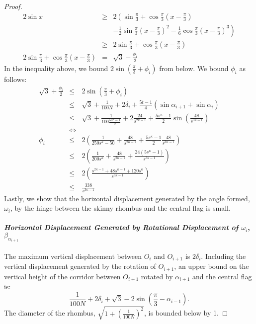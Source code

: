 \documentclass[10pt]{CSUNthesis}
\theoremstyle{plain}%
\theoremstyle{definition}
\theoremstyle{remark}
\newcommand{\lr}[1]{\left( #1 \right)}
\begin{document}
\begin{proof}
\begin{eqnarray*}
2 \sin x &\geq&  2 \left( \sin \frac{\pi}{3} + \cos \frac{\pi}{3} \lr{x - \frac{\pi}{3}}\right.\\
&& \left.- \frac{1}{2} \sin \frac{\pi}{3} \lr{x - \frac{\pi}{3}}^2 - \frac{1}{6} \cos \frac{\pi}{3} \lr{x - \frac{\pi}{3}}^3\right)\\
&\geq&2 \sin \frac{\pi}{3} + \cos \frac{\pi}{3} \lr{x - \frac{\pi}{3}}\\
2  \sin \frac{\pi}{3} + \cos \frac{\pi}{3} \lr{x - \frac{\pi}{3}} &=& \sqrt{3} + \frac{\phi_i}{2} 
\end{eqnarray*}
In the inequality above, we bound $2 \sin  \lr{\frac{\pi}{3} + \phi_i}$ from below. 
We bound $\phi_i$ as follows: 
\begin{eqnarray*}
\sqrt{3} + \frac{\phi_i}{2}  &\leq & 2\sin \lr{ \frac{\pi}{3} + \phi_i }\\
&\leq&\sqrt{3} + \frac{1}{100N} + 2 \delta_i + \frac{5t-1}{4}  \lr{ \sin \alpha_{i+1} +  \sin \alpha_{i} }\\
&\leq& \sqrt{3} + \frac{1}{100 \frac{5s^\kappa - 1}{2}} + 2 \frac{24}{s^{2\kappa-1}} + \frac{5s^\kappa-1}{2}  \sin \lr{\frac{48}{s^{3\kappa-1}}}\\
&\iff&\\
\phi_i &\leq& 2 \lr{ \frac{1}{250s^\kappa - 50} +  \frac{48}{s^{2\kappa-1}} + \frac{5s^\kappa-1}{2} \frac{48}{s^{3\kappa-1}} }\\
&\leq& 2 \lr{ \frac{1}{200 s^\kappa} + \frac{48}{s^{2\kappa-1}} + \frac{24\lr{5s^\kappa - 1}}{s^{3\kappa-1}}}\\
 &\leq& 2 \lr{ \frac{s^{2\kappa - 1} + 48s^{\kappa - 1}+ 120 s^\kappa}{s^{3\kappa-1}}}\\
&\leq& \frac{338}{s^{3\kappa - 1}}
\end{eqnarray*}
Lastly, we show that the horizontal displacement generated by the angle formed, $\omega_i$, by the hinge between the skinny rhombus and the central flag is small.
\paragraph{\textit{Horizontal Displacement Generated by Rotational Displacement of $\omega_i$}, $\beta_{\alpha_{i+1}}$}
The maximum vertical displacement between $O_i$ and $O_{i+1}$ is $2 \delta_i$.  
Including the vertical displacement generated by the rotation of $O_{i+1}$, an upper bound on the vertical height of the corridor between $O_{i+1}$ rotated by $\alpha_{i+1}$ and the central flag is:
$$\frac{1}{100N} + 2 \delta_i + \sqrt{3}- 2 \sin \lr{\frac{\pi}{3} - \alpha_{i-1}}.$$
The diameter of the rhombus, $\sqrt{1 + \lr{\frac{1}{100N}}^2}$, is bounded below by 1.


\end{proof}
\end{document}
